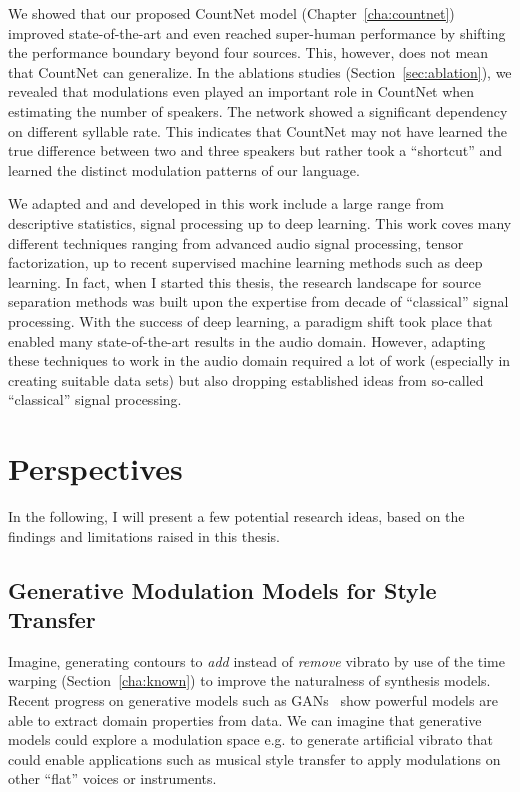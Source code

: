 We showed that our proposed CountNet model (Chapter~\ref{cha:countnet}) improved state-of-the-art and even reached super-human performance by shifting the performance boundary beyond four sources. This, however, does not mean that CountNet can generalize. In the ablations studies (Section~\ref{sec:ablation}), we revealed that modulations even played an important role in CountNet when estimating the number of speakers.
The network showed a significant dependency on different syllable rate. This indicates that CountNet may not have learned the true difference between two and three speakers but rather took a ``shortcut'' and learned the distinct modulation patterns of our language.
\par
We adapted and and developed in this work include a large range from descriptive statistics, signal processing up to deep learning.
This work coves many different techniques ranging from advanced audio signal processing, tensor factorization, up to recent supervised machine learning methods such as deep learning.
In fact, when I started this thesis, the research landscape for source separation methods was built upon the expertise from decade of “classical” signal processing.
With the success of deep learning, a paradigm shift took place that enabled many state-of-the-art results in the audio domain. However, adapting these techniques to work in the audio domain required a lot of work (especially in creating suitable data sets) but also dropping established ideas from so-called “classical” signal processing.

\section{Perspectives}

In the following, I will present a few potential research ideas, based on the findings and limitations raised in this thesis.

\subsection*{Generative Modulation Models for Style Transfer}
Imagine, generating contours to \emph{add} instead of \emph{remove} vibrato by   use of the time warping (Section~\ref{cha:known}) to improve the naturalness of synthesis models.
Recent progress on generative models such as GANs~\cite{goodfellow14} show powerful models are able to extract domain properties from data.
We can imagine that generative models could explore a modulation space e.g. to generate artificial vibrato that could enable applications such as musical style transfer to apply modulations on other ``flat'' voices or instruments.

